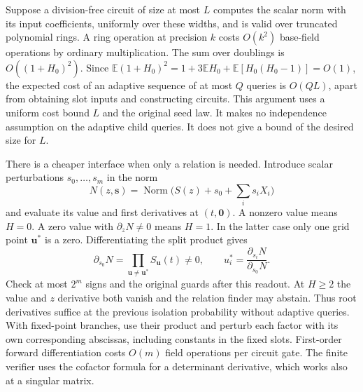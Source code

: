 \documentclass[11pt]{article}
\newcommand{\E}{\mathbb E}
\newcommand{\Nm}{\operatorname{Norm}}
\begin{document}
Suppose a division-free circuit of size at most $L$ computes the
scalar norm with its input coefficients, uniformly over these
widths, and is valid over truncated polynomial rings. A ring
operation at precision $k$ costs $O(k^2)$ base-field operations by
ordinary multiplication. The sum over doublings is $O((1+H_0)^2)$.
Since $\E(1+H_0)^2=1+3\E H_0+\E[H_0(H_0-1)]=O(1)$, the expected
cost of an adaptive sequence of at most $Q$ queries is $O(QL)$,
apart from obtaining slot inputs and constructing circuits. This
argument uses a uniform cost bound $L$ and the original seed law.
It makes no independence assumption on the adaptive child queries.
It does not give a bound of the desired size for $L$.

There is a cheaper interface when only a relation is needed.
Introduce scalar perturbations $s_0,\ldots,s_m$ in the norm
\[
  N(z,\mathbf s)=\Nm\big(S(z)+s_0+\textstyle\sum_i s_iX_i\big)
\]
and evaluate its value and first derivatives at $(t,\mathbf0)$.
A nonzero value means $H=0$. A zero value with $\partial_z N\ne0$
means $H=1$. In the latter case only one grid point $\mathbf u^*$
is a zero. Differentiating the split product gives
\[
  \partial_{s_0}N=\prod_{\mathbf u\ne\mathbf u^*}S_{\mathbf u}(t)\ne0,
       \qquad u_i^*=\frac{\partial_{s_i}N}{\partial_{s_0}N}.
\]
Check at most $2^m$ signs and the original guards after this readout.
At $H\ge2$ the value and $z$ derivative both vanish and the relation
finder may abstain. Thus root derivatives suffice at the previous
isolation probability without adaptive queries. With fixed-point
branches, use their product and perturb each factor with its own
corresponding abscissas, including constants in the fixed slots.
First-order forward differentiation costs $O(m)$ field operations
per circuit gate. The finite verifier uses the cofactor formula
for a determinant derivative, which works also at a singular matrix.
\end{document}
